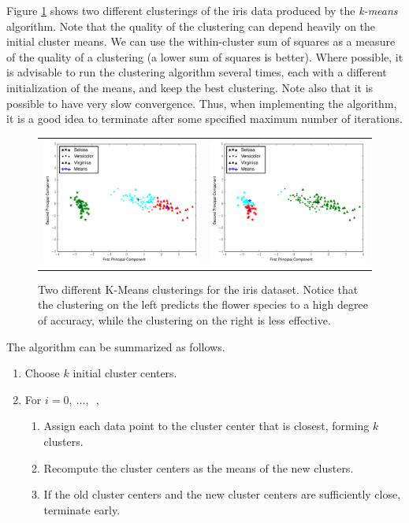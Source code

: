 Figure \ref{fig:iris_clusterings} shows two different clusterings of the iris data produced by the \emph{k-means} algorithm.
Note that the quality of the clustering can depend heavily on the initial cluster means.
We can use the within-cluster sum of squares as a measure of the quality of a clustering (a lower sum of squares is better).
Where possible, it is advisable to run the clustering algorithm several times, each with a different initialization of the means,
and keep the best clustering.
Note also that it is possible to have very slow convergence.
Thus, when implementing the algorithm, it is a good idea to terminate after some specified maximum number of iterations.
%
\begin{figure}[h]
    \centering
    \begin{tabular}{cc}
    \includegraphics[width=.49\textwidth]{iris_means_1.pdf} &
    \includegraphics[width=.49\textwidth]{iris_means_2.pdf}
    \end{tabular}
    \caption{Two different K-Means clusterings for the iris dataset.
            Notice that the clustering on the left predicts the flower species to a high degree of accuracy,
            while the clustering on the right is less effective.}
    \label{fig:iris_clusterings}
\end{figure}
%
The algorithm can be summarized as follows.
\begin{enumerate}
    \item Choose $k$ initial cluster centers.
    \item For $i=0,\ \ldots,$\ ,
    \begin{enumerate}
        \item Assign each data point to the cluster center that is closest, forming $k$ clusters.
        \item Recompute the cluster centers as the means of the new clusters.
        \item If the old cluster centers and the new cluster centers are sufficiently close, terminate early.
    \end{enumerate}
\end{enumerate}

